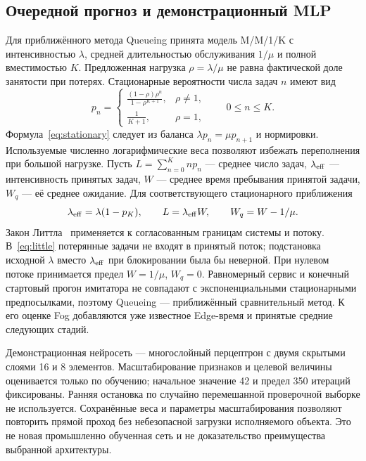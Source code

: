 \documentclass{psta}
\begin{document}
\subsection{Очередной прогноз и демонстрационный MLP}
Для приближённого метода Queueing принята модель M/M/1/K с интенсивностью $\lambda$, средней длительностью обслуживания $1/\mu$ и полной вместимостью $K$. Предложенная нагрузка $\rho=\lambda/\mu$ не равна фактической доле занятости при потерях. Стационарные вероятности числа задач $n$ имеют вид
\begin{equation}\label{eq:stationary}
 p_n=\begin{cases}\displaystyle\frac{(1-\rho)\rho^n}{1-\rho^{K+1}},&\rho\ne1,\\[4pt]
 \displaystyle\frac1{K+1},&\rho=1,\end{cases}\qquad 0\le n\le K.
\end{equation}
Формула~\eqref{eq:stationary} следует из баланса $\lambda p_n=\mu p_{n+1}$ и нормировки. Используемые численно логарифмические веса позволяют избежать переполнения при большой нагрузке. Пусть $L=\sum_{n=0}^{K}np_n$ --- среднее число задач, $\lambda_{\rm eff}$ --- интенсивность принятых задач, $W$ --- среднее время пребывания принятой задачи, $W_q$ --- её среднее ожидание. Для соответствующего стационарного приближения
\begin{equation}\label{eq:little}
\lambda_{\rm eff}=\lambda(1-p_K),\qquad
L=\lambda_{\rm eff}W,\qquad W_q=W-1/\mu.
\end{equation}
Закон Литтла~\cite{little} применяется к согласованным границам системы и потоку. В~\eqref{eq:little} потерянные задачи не входят в принятый поток; подстановка исходной $\lambda$ вместо $\lambda_{\rm eff}$ при блокировании была бы неверной. При нулевом потоке принимается предел $W=1/\mu$, $W_q=0$. Равномерный сервис и конечный стартовый прогон имитатора не совпадают с экспоненциальными стационарными предпосылками, поэтому Queueing --- приближённый сравнительный метод. К его оценке Fog добавляются уже известное Edge-время и принятые средние следующих стадий.

Демонстрационная нейросеть --- многослойный перцептрон с двумя скрытыми слоями 16 и 8 элементов. Масштабирование признаков и целевой величины оценивается только по обучению; начальное значение 42 и предел 350 итераций фиксированы. Ранняя остановка по случайно перемешанной проверочной выборке не используется. Сохранённые веса и параметры масштабирования позволяют повторить прямой проход без небезопасной загрузки исполняемого объекта. Это не новая промышленно обученная сеть и не доказательство преимущества выбранной архитектуры.
\end{document}
